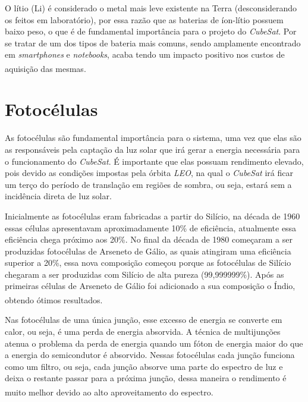 \documentclass[
	12pt,				%
	openright,			%
	oneside,			%
	a4paper,			%
	english,			%
	french,				%
	spanish,			%
	brazil,				%
	oldfontcommands
	]{abntex2}
\begin{document}
	O lítio (Li) é considerado o metal mais leve existente na Terra (desconsiderando os feitos em laboratório), por essa razão que as baterias de íon-lítio possuem baixo peso, o que é de fundamental importância para o projeto do \textit{CubeSat}. Por se tratar de um dos tipos de bateria mais comuns, sendo amplamente encontrado em \textit{smartphones} e \textit{notebooks}, acaba tendo um impacto positivo nos custos de aquisição das mesmas.\textsuperscript{\cite{TecMundo}}
	
\section[Fotocélulas]{Fotocélulas} \label{Cap_Cell}

	As fotocélulas são fundamental importância para o sistema, uma vez que elas são as responsáveis pela captação da luz solar que irá gerar a energia necessária para o funcionamento do \textit{CubeSat}. É importante que elas possuam rendimento elevado, pois devido as condições impostas pela órbita \textit{LEO}, na qual o \textit{CubeSat} irá ficar um terço do período de translação em regiões de sombra, ou seja, estará sem a incidência direta de luz solar.
	
	Inicialmente as fotocélulas eram fabricadas a partir do Silício, na década de 1960 essas células apresentavam aproximadamente 10\% de eficiência, atualmente essa eficiência chega próximo aos 20\%. No final da década de 1980 começaram a ser produzidas fotocélulas de Arseneto de Gálio, as quais atingiram uma eficiência superior a 20\%, essa nova composição começou porque as fotocélulas de Silício chegaram a ser produzidas com Silício de alta pureza (99,999999\%). Após as primeiras células de Arseneto de Gálio foi adicionado a sua composição o Índio, obtendo ótimos resultados.\textsuperscript{\cite{Fatemi}}
	
	Nas fotocélulas de uma única junção, esse excesso de energia se converte em calor, ou seja, é uma perda de energia absorvida. A técnica de multijunções atenua o problema da perda de energia quando um fóton de energia maior do que a energia do semicondutor é absorvido. Nessas fotocélulas cada junção funciona como um filtro, ou seja, cada junção absorve uma parte do espectro de luz e deixa o restante passar para a próxima junção, dessa maneira o rendimento é muito melhor devido ao alto aproveitamento do espectro.\textsuperscript{\cite{Fatemi}}
	
\end{document}
